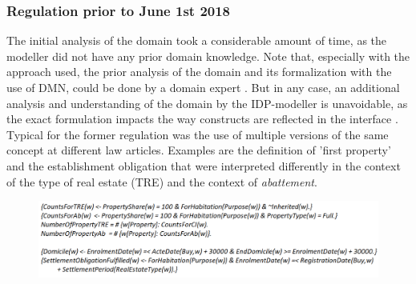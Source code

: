 \subsubsection{Regulation prior to June 1st 2018}
\label{sec:prior2018}
The initial analysis of the domain took a considerable amount of time, as the modeller did not have any prior domain knowledge.
Note that, especially with the approach used, the prior analysis of the domain and its formalization with the use of DMN, could be done by a domain expert \cite{iets over DMN en gebruik door business users}.
But in any case, an additional analysis and understanding of the domain by the IDP-modeller is unavoidable, as the exact formulation impacts the way constructs are reflected in the interface \cite{Marjolein}.
Typical for the former regulation was the use of multiple versions of the same concept at different law articles.
Examples are the definition of 'first property' and the establishment obligation that were interpreted differently in the context of the type of real estate (TRE) and the context of \textit{abattement}.
\begin{figure}[h]
    \includegraphics[angle=0,width = 1\linewidth]{img/codeOld.png}
	\label{fig:code}
\end{figure}

